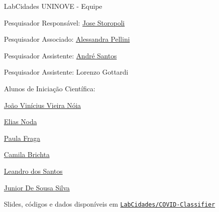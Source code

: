 \documentclass[aspectratio=169]{beamer}                    %
\begin{document}
\begin{frame}{LabCidades UNINOVE - Equipe}
    \begin{vfilleditems}
        \item Pesquisador Responsável: \href{https://github.com/storopoli}{Jose Storopoli}
        \item Pesquisador Associado: \href{https://github.com/acgpellini}{Alessandra Pellini}
        \item Pesquisador Assistente: \href{https://github.com/andrelmfsantos}{André Santos}
        \item Pesquisador Assistente: Lorenzo Gottardi
        \item Alunos de Iniciação Científica:
        \begin{vfilleditems}
            \item \href{https://github.com/vinivieiran}{João Vinícius Vieira Nóia}
            \item \href{https://github.com/Elias-Noda}{Elias Noda}
            \item \href{https://github.com/Paula-Fraga}{Paula Fraga}
            \item \href{https://github.com/camibrichta}{Camila Brichta}
            \item \href{https://github.com/leandrors91}{Leandro dos Santos}
            \item \href{https://github.com/juniorghostinthewires}{Junior De Sousa Silva}
        \end{vfilleditems}
    \end{vfilleditems}
    Slides, códigos e dados disponíveis em \href{https://github.com/LabCidades/COVID-Classifier}{\texttt{LabCidades/COVID-Classifier}}
\end{frame}
\end{document}
